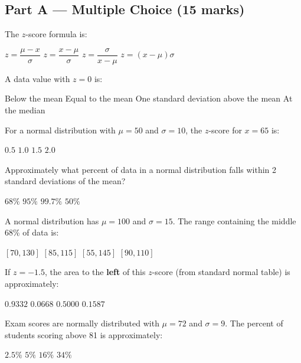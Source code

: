 \documentclass[addpoints]{exam}
\begin{document}
\newpage
\begin{questions}

\section*{Part A --- Multiple Choice (15 marks)}
\vspace{5mm}

\question[1] The $z$-score formula is:
\begin{choices}
    \choice $z = \dfrac{\mu - x}{\sigma}$
    \correctchoice $z = \dfrac{x - \mu}{\sigma}$
    \choice $z = \dfrac{\sigma}{x - \mu}$
    \choice $z = (x - \mu)\sigma$
\end{choices}

\question[1] A data value with $z = 0$ is:
\begin{choices}
    \choice Below the mean
    \correctchoice Equal to the mean
    \choice One standard deviation above the mean
    \choice At the median
\end{choices}

\question[1] For a normal distribution with $\mu = 50$ and $\sigma = 10$, the $z$-score for $x = 65$ is:
\begin{choices}
    \choice $0.5$
    \choice $1.0$
    \correctchoice $1.5$
    \choice $2.0$
\end{choices}

\question[1] Approximately what percent of data in a normal distribution falls within 2 standard
deviations of the mean?
\begin{choices}
    \choice $68\%$
    \correctchoice $95\%$
    \choice $99.7\%$
    \choice $50\%$
\end{choices}

\question[1] A normal distribution has $\mu = 100$ and $\sigma = 15$. The range containing
the middle 68\% of data is:
\begin{choices}
    \choice $[70, 130]$
    \correctchoice $[85, 115]$
    \choice $[55, 145]$
    \choice $[90, 110]$
\end{choices}

\question[1] If $z = -1.5$, the area to the \textbf{left} of this $z$-score (from standard normal
table) is approximately:
\begin{choices}
    \choice $0.9332$
    \correctchoice $0.0668$
    \choice $0.5000$
    \choice $0.1587$
\end{choices}

\question[1] Exam scores are normally distributed with $\mu = 72$ and $\sigma = 9$. The percent
of students scoring above 81 is approximately:
\begin{choices}
    \choice $2.5\%$
    \choice $5\%$
    \correctchoice $16\%$
    \choice $34\%$
\end{choices}


\end{questions}
\end{document}
